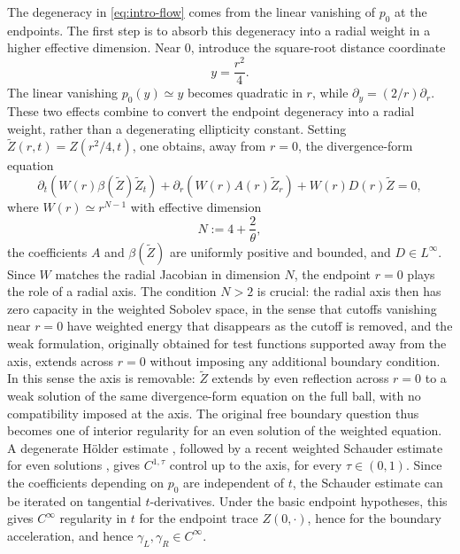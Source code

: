 \documentclass[11pt]{amsart}
\begin{document}
The degeneracy in \eqref{eq:intro-flow} comes from the linear vanishing of
\(p_0\) at the endpoints. The first step is to absorb this degeneracy
into a radial weight in a higher effective dimension. Near \(0\), introduce the
square-root distance coordinate
\[
        y=\frac{r^2}{4}.
\]
The linear vanishing \(p_0(y)\simeq y\) becomes quadratic in \(r\), while
\(\partial_y=(2/r)\partial_r\). These two effects combine to convert the
endpoint degeneracy into a radial weight, rather than a degenerating
ellipticity constant. Setting \(\widetilde Z(r,t)=Z(r^2/4,t)\), one obtains, away from
\(r=0\), the divergence-form equation
\[
        \partial_t\!\left(W(r)\beta(\widetilde Z)\widetilde Z_t\right)
        +\partial_r\!\left(W(r)A(r)\widetilde Z_r\right)
        +W(r)D(r)\widetilde Z=0,
\]
where \(W(r)\simeq r^{N-1}\) with effective dimension
\begin{equation}
\label{eq:N-intro}
        N:=4+\frac2\theta,
\end{equation}
the coefficients \(A\)
and \(\beta(\widetilde Z)\) are uniformly positive and bounded, and \(D\in L^\infty\).
Since \(W\) matches the radial Jacobian in dimension \(N\), the endpoint
\(r=0\) plays the role of a radial axis. The condition \(N>2\) is crucial: the radial
axis then has zero capacity in the weighted Sobolev space, in the sense that
cutoffs vanishing near \(r=0\) have weighted energy that disappears as the
cutoff is removed, and the weak formulation, originally obtained for test
functions supported away from the axis, extends across \(r=0\) without
imposing any additional boundary condition. In this sense the axis is
removable: \(\widetilde Z\) extends by even reflection across \(r=0\) to a weak
solution of the same divergence-form equation on the full ball, with no
compatibility imposed at the axis. The original free boundary question
thus becomes one of interior regularity for an even solution of the
weighted equation. A degenerate
H\"older estimate \cite{Zamboni}, followed by a recent weighted
Schauder estimate for even solutions \cite{STV2021}, gives
\(C^{1,\tau}\) control up to the axis, for every
\(\tau\in(0,1)\).
Since the coefficients depending on \(p_0\) are independent of \(t\),
the Schauder estimate can be iterated on tangential \(t\)-derivatives.
Under the basic endpoint hypotheses,
this gives \(C^\infty\) regularity in \(t\) for the endpoint trace
\(Z(0,\cdot)\), hence for the boundary acceleration, and hence
\(\gamma_L,\gamma_R\in C^\infty\).
\end{document}

